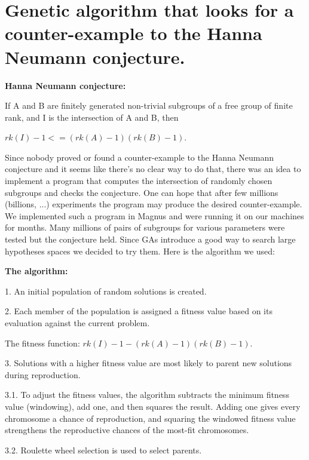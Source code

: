\documentclass[11pt]{article}
\begin{document}
\section{ Genetic algorithm that looks for a counter-example 
	to the Hanna Neumann conjecture. }


\vspace{5mm}
\noindent
\textbf{Hanna Neumann conjecture:} 

	If A and B are finitely generated non-trivial subgroups of a
free group of finite rank, and I is the intersection of A and B, then

	$rk(I)-1 <= (rk(A)-1)(rk(B)-1)$.

\vspace{5mm}

	Since nobody proved or found a counter-example to the Hanna
Neumann conjecture and it seems like there's no clear way to do that,
there was an idea to implement a program that computes the
intersection of randomly chosen subgroups and checks the
conjecture. One can hope that after few millions (billions, ...)
experiments the program may produce the desired counter-example. We
implemented such a program in Magnus and were running it on our
machines for months. Many millions of pairs of subgroups for various
parameters were tested but the conjecture held. Since GAs introduce a
good way to search large hypotheses spaces we decided to try them.
Here is the algorithm we used:


\vspace{5mm}
\noindent
\textbf{The algorithm: }
\vspace{5mm}


1. An initial population of random solutions is created.

2. Each member of the population is assigned a fitness value based on
its evaluation against the current problem.

   The fitness function:  $rk(I)-1 - (rk(A) - 1) (rk(B) - 1)$.

3. Solutions with a higher fitness value are most likely to parent new
solutions during reproduction. 

3.1. To adjust the fitness values, the algorithm subtracts the
minimum fitness value (windowing), add one, and then squares the
result. Adding one gives every chromosome a chance of reproduction,
and squaring the windowed fitness value strengthens the reproductive
chances of the most-fit chromosomes.

3.2. Roulette wheel selection is used to select parents. 
\end{document}
